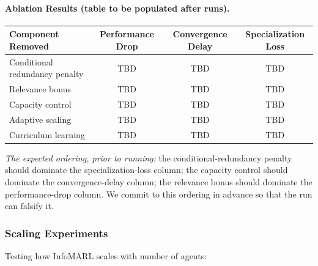 \documentclass[10pt, letterpaper]{article}
\begin{document}
\paragraph{Ablation Results (table to be populated after runs).}

\begin{center}
\begin{tabular}{lccc}
\toprule
\textbf{Component Removed} & \textbf{Performance Drop} & \textbf{Convergence Delay} & \textbf{Specialization Loss} \\
\midrule
Conditional redundancy penalty & TBD & TBD & TBD \\
Relevance bonus & TBD & TBD & TBD \\
Capacity control & TBD & TBD & TBD \\
Adaptive scaling & TBD & TBD & TBD \\
Curriculum learning & TBD & TBD & TBD \\
\bottomrule
\end{tabular}
\end{center}
\emph{The expected ordering, prior to running:} the conditional-redundancy penalty should dominate the specialization-loss column; the capacity control should dominate the convergence-delay column; the relevance bonus should dominate the performance-drop column. We commit to this ordering in advance so that the run can falsify it.

\subsubsection{Scaling Experiments}

Testing how InfoMARL scales with number of agents:
\end{document}
